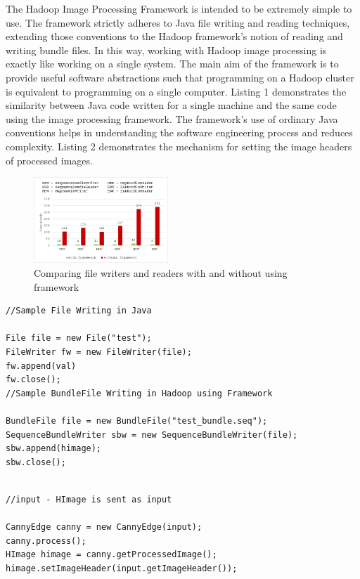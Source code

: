 \documentclass[conference]{IEEEtran}
\begin{document}
The Hadoop Image Processing Framework is intended to be extremely
simple to use. The framework strictly adheres to Java file writing and
reading techniques, extending those conventions to the Hadoop
framework's notion of reading and writing bundle files.  In this way,
working with Hadoop image processing is exactly like working on a
single system.  The main aim of the framework is to provide useful
software abstractions such that programming on a Hadoop cluster is
equivalent to programming on a single computer.  Listing 1
demonstrates the similarity between Java code written for a single
machine and the same code using the image processing framework.  The
framework's use of ordinary Java conventions helps in understanding
the software engineering process and reduces complexity.  Listing 2
demonstrates the mechanism for setting the image headers of processed
images.

\begin{figure}[h]
  \centering
  \includegraphics[width=0.45\textwidth]{files-chart2}
  \caption{Comparing file writers and readers with and without using
    framework}
  \label{fig:files-chart}
\end{figure}

\begin{lstlisting}[caption = Comparing FileWriter instance in java and SequenceBundleWriter instance in Hadoop Image Processing framework ]
//Sample File Writing in Java

File file = new File("test");
FileWriter fw = new FileWriter(file);
fw.append(val)
fw.close();
//Sample BundleFile Writing in Hadoop using Framework

BundleFile file = new BundleFile("test_bundle.seq");
SequenceBundleWriter sbw = new SequenceBundleWriter(file);
sbw.append(himage);
sbw.close();
\end{lstlisting}

\begin{lstlisting}[caption = Setting image headers for processed images using Hadoop Image Processing Framework]

//input - HImage is sent as input 

CannyEdge canny = new CannyEdge(input);
canny.process();
HImage himage = canny.getProcessedImage();
himage.setImageHeader(input.getImageHeader());

\end{lstlisting}
\end{document}
